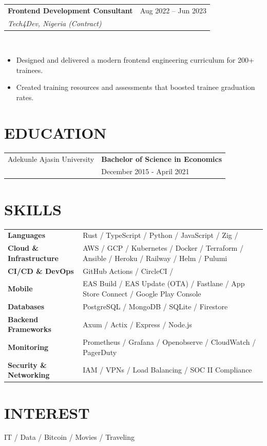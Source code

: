 \documentclass[a4paper,11pt]{article}
\makeatletter
\newenvironment{joblong}[3]
    {
    \needspace{6\baselineskip}
    \parskip=0pt
    \noindent
    \begin{tabular*}{\textwidth}[t]{@{}l@{\extracolsep{\fill}}r@{}}
    \textbf{#1} & #2 \\
    \textit{#3} &
    \end{tabular*}\\[2pt]
    \nopagebreak
    \begin{itemize}[nosep,after=\strut, leftmargin=1em, itemsep=2pt,label=--]
    }
    {
    \end{itemize}
    }
\makeatother
\begin{document}
\begin{joblong}{Frontend Development Consultant}{Aug 2022 -- Jun 2023}{Tech4Dev, Nigeria (Contract)}
\item Designed and delivered a modern frontend engineering curriculum for 200+ trainees.
\item Created training resources and assessments that boosted trainee graduation rates.
\end{joblong}


\section{EDUCATION}

\begin{tabularx}{\linewidth}{@{}l X@{}}
Adekunle Ajasin University & \textbf{Bachelor of Science in Economics} \\
                          & December 2015 - April 2021 \\[10pt]
\end{tabularx}

\section{SKILLS}

\begin{tabularx}{\linewidth}{@{}l X@{}}
\textbf{Languages} & Rust / TypeScript / Python / JavaScript / Zig / \\
\textbf{Cloud \& Infrastructure} & AWS / GCP / Kubernetes / Docker / Terraform / Ansible / Heroku / Railway / Helm / Pulumi \\
\textbf{CI/CD \& DevOps} & GitHub Actions / CircleCI /  \\
\textbf{Mobile} & EAS Build / EAS Update (OTA) / Fastlane / App Store Connect / Google Play Console \\
\textbf{Databases} & PostgreSQL / MongoDB / SQLite / Firestore \\
\textbf{Backend Frameworks} & Axum / Actix / Express / Node.js \\
\textbf{Monitoring} & Prometheus / Grafana / Openobserve / CloudWatch / PagerDuty \\
\textbf{Security \& Networking} & IAM / VPNs / Load Balancing / SOC II Compliance
\end{tabularx}

\section{INTEREST}
IT / Data / Bitcoin / Movies / Traveling
\end{document}

